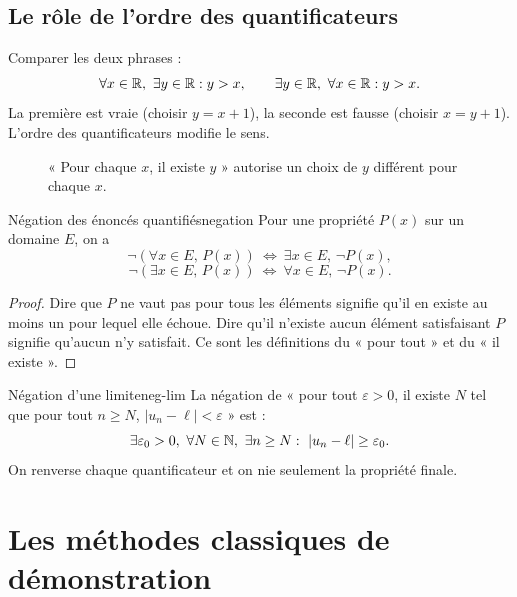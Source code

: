 \subsection{Le rôle de l'ordre des quantificateurs}
Comparer les deux phrases :
\[
\forall x\in\mathbb R,\ \exists y\in\mathbb R : y>x,
\qquad
\exists y\in\mathbb R,\ \forall x\in\mathbb R : y>x.
\]
La première est vraie (choisir $y=x+1$), la seconde est fausse (choisir $x=y+1$). L'ordre des quantificateurs modifie le sens.

\begin{figure}[htbp]\centering
{}
\caption{« Pour chaque $x$, il existe $y$ » autorise un choix de $y$ différent pour chaque $x$.}\label{fig:log:quantif}
\end{figure}

\begin{proposition}{Négation des énoncés quantifiés}{negation}
Pour une propriété $P(x)$ sur un domaine $E$, on a
\[
\neg(\forall x\in E,\,P(x))\ \Leftrightarrow\ \exists x\in E,\,\neg P(x),
\]
\[
\neg(\exists x\in E,\,P(x))\ \Leftrightarrow\ \forall x\in E,\,\neg P(x).
\]
\end{proposition}
\begin{proof}
Dire que $P$ ne vaut pas pour tous les éléments signifie qu'il en existe au moins un pour lequel elle échoue. Dire qu'il n'existe aucun élément satisfaisant $P$ signifie qu'aucun n'y satisfait. Ce sont les définitions du « pour tout » et du « il existe ».
\end{proof}
\begin{exemple}{Négation d'une limite}{neg-lim}
La négation de « pour tout $\varepsilon>0$, il existe $N$ tel que pour tout $n\ge N$, $|u_n-\ell|<\varepsilon$ » est :
\[
\exists\varepsilon_0>0,\ \forall N\in\mathbb N,\ \exists n\ge N:\ |u_n-\ell|\ge\varepsilon_0.
\]
On renverse chaque quantificateur et on nie seulement la propriété finale.
\end{exemple}

\section{Les méthodes classiques de démonstration}
